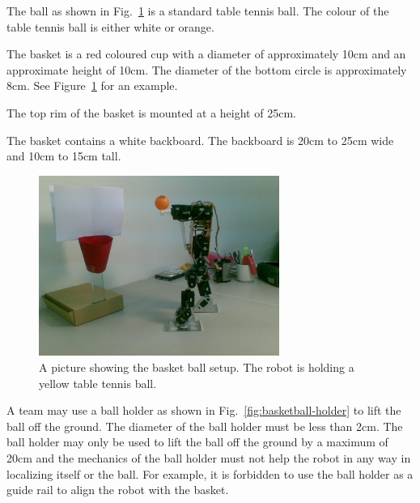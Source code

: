 \documentclass[12pt]{hurocup}
\begin{document}

\begin{lawlist}[BB]

  \item The ball as shown in Fig.~\ref{fig:basketball-basket} is a
  standard table tennis ball. The colour of the table tennis ball is
  either white or orange.

  \item The basket is a red coloured cup with a diameter of
  approximately 10cm and an approximate height of 10cm. The diameter
  of the bottom circle is approximately 8cm. See
  Figure~\ref{fig:basketball-basket} for an example.

  \item The top rim of the basket is mounted at a height of 25cm.

  \item The basket contains a white backboard. The backboard is 20cm
  to 25cm wide and 10cm to 15cm tall.

 \begin{figure}
    \begin{center}
      \includegraphics[width=0.7\textwidth]{Figures/basketball-basket}
    \end{center}
    \caption{A picture showing the basket ball setup. The robot is
             holding a yellow table tennis ball.}
    \label{fig:basketball-basket}
  \end{figure}

 \item A team may use a ball holder as shown in
   Fig.~\ref{fig:basketball-holder} to lift the ball off the
   ground. The diameter of the ball holder must be less than 2cm. The
   ball holder may only be used to lift the ball off the ground by a
   maximum of 20cm and the mechanics of the ball holder must not help
   the robot in any way in localizing itself or the ball. For example,
   it is forbidden to use the ball holder as a guide rail to align the
   robot with the basket.
  

\end{lawlist}
\end{document}
